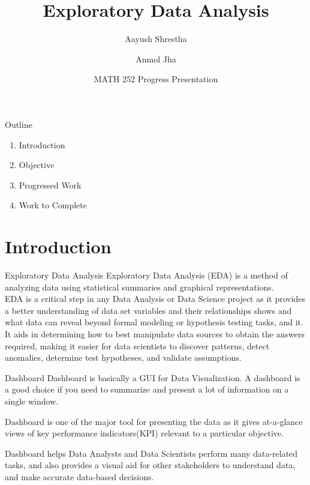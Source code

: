 \documentclass{beamer}
\title{Exploratory Data Analysis}
\date{\small MATH 252 Progress Presentation}
\institute{ Kathmandu University \\ Department of Computational Mathematics}
\author{Aayush Shrestha \and Anmol Jha}
\begin{document}
	
	\begin{frame}
		\titlepage
	\end{frame}
	
	\begin{frame}{Outline}
		\begin{enumerate}
			\item Introduction
			\item Objective
			\item Progressed Work
			\item Work to Complete
		\end{enumerate}
	\end{frame}
	
	\section{Introduction}
	\begin{frame}{Exploratory Data Analysis}
		Exploratory Data Analysis (EDA) is a method of analyzing data using statistical summaries and graphical representations.\\

		EDA is a critical step in any Data Analysis or Data Science project as it provides a better understanding of data set variables and their relationships shows and what data can reveal beyond formal modeling or hypothesis testing tasks, and it.\\
		
		It aids in determining how to best manipulate data sources to obtain the answers required, making it easier for data scientists to discover patterns, detect anomalies, determine test hypotheses, and validate assumptions.
		
	\end{frame}
	
	\begin{frame}{Dashboard}
		Dashboard is basically a GUI for Data Visualization. A dashboard is a good choice if you need to summarize and present a lot of information on a single window.
		
		Dashboard is one of the major tool for presenting the data as it gives at-a-glance views of key performance indicators(KPI) relevant to a particular objective. 
		
		Dashboard helps Data Analysts and Data Scientists perform many data-related tasks, and also provides a visual aid for other stakeholders to understand data, and make accurate data-based decisions.
		
	\end{frame}
	
\end{document}

